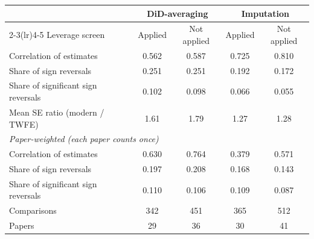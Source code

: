 \begin{tabular}{lcccc}
\toprule
 & \multicolumn{2}{c}{DiD-averaging} & \multicolumn{2}{c}{Imputation} \\
\cmidrule(lr){2-3}\cmidrule(lr){4-5}
Leverage screen & Applied & Not applied & Applied & Not applied \\
\midrule
Correlation of estimates & 0.562 & 0.587 & 0.725 & 0.810 \\
Share of sign reversals & 0.251 & 0.251 & 0.192 & 0.172 \\
Share of significant sign reversals & 0.102 & 0.098 & 0.066 & 0.055 \\
Mean SE ratio (modern / TWFE) & 1.61 & 1.79 & 1.27 & 1.28 \\
\midrule
\multicolumn{5}{l}{\emph{Paper-weighted (each paper counts once)}} \\
Correlation of estimates & 0.630 & 0.764 & 0.379 & 0.571 \\
Share of sign reversals & 0.197 & 0.208 & 0.168 & 0.143 \\
Share of significant sign reversals & 0.110 & 0.106 & 0.109 & 0.087 \\
\midrule
Comparisons & 342 & 451 & 365 & 512 \\
Papers & 29 & 36 & 30 & 41 \\
\bottomrule
\end{tabular}
